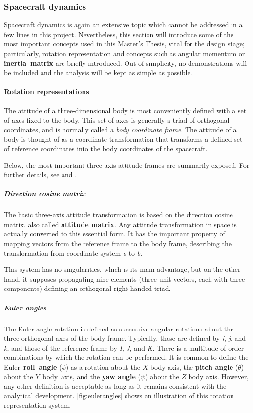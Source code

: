 \subsubsection{Spacecraft dynamics}

Spacecraft dynamics is again an extensive topic which cannot be addressed in a few lines in this project. Nevertheless, this section will introduce some of the most important concepts used in this Master's Thesis, vital for the design stage; particularly, rotation representation and concepts such as angular momentum or \textbf{inertia~matrix} are briefly introduced. Out of simplicity, no demonstrations will be included and the analysis will be kept as simple as possible.

\paragraph{Rotation representations}\label{sec:rotationrepres}

The attitude of a three-dimensional body is most conveniently defined with a set of axes fixed to the body. This set of axes is generally a triad of orthogonal coordinates, and is normally called a \textit{body coordinate frame}. The attitude of a body is thought of as a coordinate transformation that transforms a defined set of reference coordinates into the body coordinates of the spacecraft. 

Below, the most important three-axis attitude frames are summarily exposed. For further details, see \cite{sabroff} and \cite{wertz}.

\vspace{-0.2cm}
\subparagraph{Direction cosine matrix}\label{sec:directioncosine}

The basic three-axis attitude transformation is based on the direction cosine matrix, also called \textbf{attitude matrix}. Any attitude transformation in space is actually converted to this essential form. It has the important property of mapping vectors from the reference frame to the body frame, describing the transformation from coordinate system \textit{a} to \textit{b}.

This system has no singularities, which is its main advantage, but on the other hand, it supposes propagating nine elements (three unit vectors, each with three components) defining an orthogonal right-handed triad.

\subparagraph{Euler angles}\label{sec:eulerangles}

The Euler angle rotation is defined as successive angular rotations about the three orthogonal axes of the body frame. Typically, these are defined by \textit{i}, \textit{j}, and \textit{k}, and those of the reference frame by \textit{I}, \textit{J}, and \textit{K}. There is a multitude of order combinations by which the rotation can be performed.  It is common to define the Euler~\textbf{roll~angle} ($\phi$) as a rotation about the $X$ body axis, the \textbf{pitch angle} ($\theta$) about the $Y$~body~axis, and the \textbf{yaw angle} ($\psi$) about the $Z$ body axis. However, any other definition is acceptable as long as it remains consistent with the analytical development. \autoref{fig:eulerangles} shows an illustration of this rotation representation system. 

